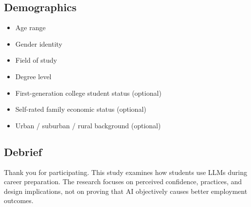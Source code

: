 \documentclass[sigconf,review,anonymous]{acmart}
\begin{document}
\subsection*{Demographics}

\begin{itemize}
  \item[\textbf{D1.}] Age range
  \item[\textbf{D2.}] Gender identity
  \item[\textbf{D3.}] Field of study
  \item[\textbf{D4.}] Degree level
  \item[\textbf{D5.}] First-generation college student status (optional)
  \item[\textbf{D6.}] Self-rated family economic status (optional)
  \item[\textbf{D7.}] Urban / suburban / rural background (optional)
\end{itemize}

\subsection*{Debrief}

Thank you for participating.  This study examines how students use LLMs
during career preparation.  The research focuses on perceived confidence,
practices, and design implications, not on proving that AI objectively
causes better employment outcomes.
\end{document}
